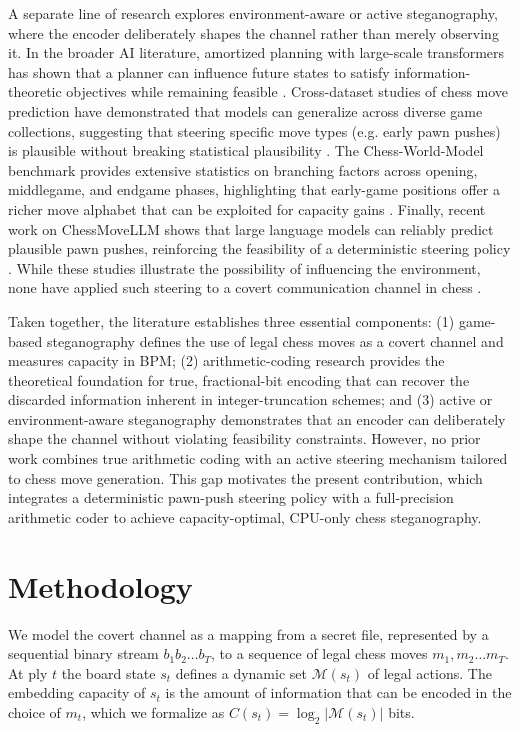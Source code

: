 \documentclass[journal]{IEEEtran}
\begin{document}
A separate line of research explores environment-aware or active steganography, where the encoder deliberately shapes the channel rather than merely observing it. In the broader AI literature, amortized planning with large-scale transformers has shown that a planner can influence future states to satisfy information-theoretic objectives while remaining feasible . Cross-dataset studies of chess move prediction have demonstrated that models can generalize across diverse game collections, suggesting that steering specific move types (e.g. early pawn pushes) is plausible without breaking statistical plausibility . The Chess-World-Model benchmark provides extensive statistics on branching factors across opening, middlegame, and endgame phases, highlighting that early-game positions offer a richer move alphabet that can be exploited for capacity gains . Finally, recent work on ChessMoveLLM shows that large language models can reliably predict plausible pawn pushes, reinforcing the feasibility of a deterministic steering policy . While these studies illustrate the possibility of influencing the environment, none have applied such steering to a covert communication channel in chess \cite{ruoss2024amortizedplann, durge2026crossdataset, walker2026chessworld, diallo2025chessmovellmla} \cite{ruoss2024amortizedplann, durge2026crossdataset, walker2026chessworld, diallo2025chessmovellmla}.

Taken together, the literature establishes three essential components: (1) game-based steganography defines the use of legal chess moves as a covert channel and measures capacity in BPM; (2) arithmetic-coding research provides the theoretical foundation for true, fractional-bit encoding that can recover the discarded information inherent in integer-truncation schemes; and (3) active or environment-aware steganography demonstrates that an encoder can deliberately shape the channel without violating feasibility constraints. However, no prior work combines true arithmetic coding with an active steering mechanism tailored to chess move generation. This gap motivates the present contribution, which integrates a deterministic pawn-push steering policy with a full-precision arithmetic coder to achieve capacity-optimal, CPU-only chess steganography.

\section{Methodology}\label{sec:methodology}
We model the covert channel as a mapping from a secret file, represented by a sequential binary stream $b_1 b_2 \dots b_T$, to a sequence of legal chess moves $m_1, m_2 \dots m_T$. At ply $t$ the board state $s_t$ defines a dynamic set $\mathcal{M}(s_t)$ of legal actions. The embedding capacity of $s_t$ is the amount of information that can be encoded in the choice of $m_t$, which we formalize as $C(s_t)=\log_2|\mathcal{M}(s_t)|$ bits.
\end{document}
